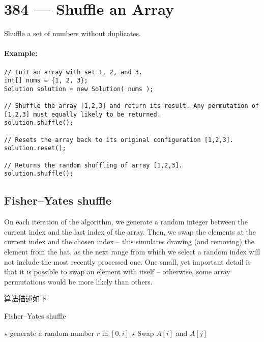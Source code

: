 \section{384 --- Shuffle an Array}
Shuffle a set of numbers without duplicates.

\paragraph{Example:}

\begin{lstlisting}[style=customc]
// Init an array with set 1, 2, and 3.
int[] nums = {1, 2, 3};
Solution solution = new Solution( nums );

// Shuffle the array [1,2,3] and return its result. Any permutation of [1,2,3] must equally likely to be returned.
solution.shuffle();

// Resets the array back to its original configuration [1,2,3].
solution.reset();

// Returns the random shuffling of array [1,2,3].
solution.shuffle();

\end{lstlisting}

\subsection{Fisher–Yates shuffle}
On each iteration of the algorithm, we generate a random integer between the current index and the last index of the array. Then, we swap the elements at the current index and the chosen index -- this simulates drawing (and removing) the element from the hat, as the next range from which we select a random index will not include the most recently processed one. One small, yet important detail is that it is possible to swap an element with itself -- otherwise, some array permutations would be more likely than others. 

算法描述如下
\setcounter{algorithm}{0}
\begin{algorithm}[H]
\caption{Fisher–Yates shuffle}
\begin{algorithmic}[1]
\State $\star$ generate a random number $r$ in $[0, i]$
\State $\star$ Swap $A[i]$ and $A[j]$
\EndFor
\EndProcedure
\end{algorithmic}
\end{algorithm}


